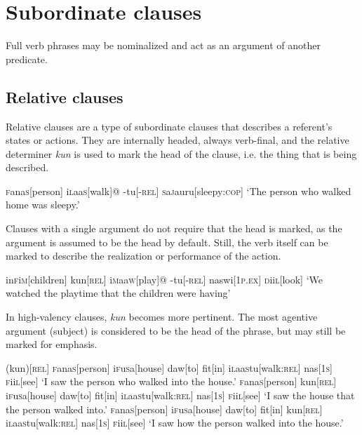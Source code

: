 \documentclass[a4paper,10pt,twoside,openright]{memoir}
\newcommand{\famword}[5]{#1\textsc{#2}#3\textsc{#4}#5}
\begin{document}
\section{Subordinate clauses}

Full verb phrases may be nominalized and act as an argument of another predicate.

\subsection{Relative clauses}

Relative clauses are a type of subordinate clauses that describes a referent's states or actions. They are internally headed, always verb-final, and the relative determiner \emph{kun} is used to mark the head of the clause, i.e. the thing that is being described.

\ex
\begingl
\famword{}{f}{ana}{s}{}[person]
\famword{i}{l}{aa}{s}{}[walk]@
-tu[\textsc{-rel}]
\famword{}{s}{a}{j}{a}uru[sleepy:\textsc{cop}]
\glft `The person who walked home was sleepy.'
\endgl
\xe

Clauses with a single argument do not require that the head is marked, as the argument is assumed to be the head by default. Still, the verb itself can be marked to describe the realization or performance of the action.

\ex
\begingl
\famword{in}{f}{i}{m}{}[children]
kun[\textsc{rel}]
\famword{i}{m}{aa}{w}{}[play]@
-tu[\textsc{-rel}]
naswi[\textsc{1p.ex}]
\famword{}{d}{ii}{l}{}[look]
\glft `We watched the playtime that the children were having'
\endgl
\xe

In high-valency clauses, \emph{kun} becomes more pertinent. The most agentive argument (subject) is considered to be the head of the phrase, but may still be marked for emphasis.

\pex[interpartskip=3ex]
\a
\begingl
(kun)[\textsc{rel}]
\famword{}{f}{ana}{s}{}[person]
\famword{i}{f}{u}{s}{a}[house]
daw[to]
fit[in]
\famword{i}{l}{aa}{s}{}tu[walk\textsc{:rel}]
nas[\textsc{1s}]
\famword{}{f}{ii}{l}{}[see]
\glft `I saw the person who walked into the house.'
\endgl
\a
\begingl
\famword{}{f}{ana}{s}{}[person]
kun[\textsc{rel}]
\famword{i}{f}{u}{s}{a}[house]
daw[to]
fit[in]
\famword{i}{l}{aa}{s}{}tu[walk\textsc{:rel}]
nas[\textsc{1s}]
\famword{}{f}{ii}{l}{}[see]
\glft `I saw the house that the person walked into.'
\endgl
\a
\begingl
\famword{}{f}{ana}{s}{}[person]
\famword{i}{f}{u}{s}{a}[house]
daw[to]
fit[in]
kun[\textsc{rel}]
\famword{i}{l}{aa}{s}{}tu[walk\textsc{:rel}]
nas[\textsc{1s}]
\famword{}{f}{ii}{l}{}[see]
\glft `I saw how the person walked into the house.'
\endgl
\xe
\end{document}
